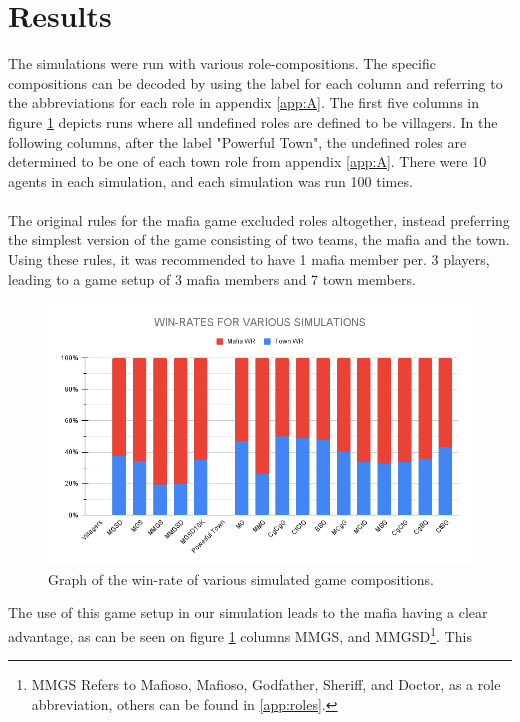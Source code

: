 \section{Results}\label{sec:results}
The simulations were run with various role-compositions. The specific
compositions can be decoded by using the label for each column and referring to
the abbreviations for each role in appendix \ref{app:A}. The first five columns
in figure \ref{fig:VariousSimulations} depicts runs where all undefined roles
are defined to be villagers. In the following columns, after the label
"Powerful Town", the undefined roles are determined to be one of each town role
from appendix \ref{app:A}. There were 10 agents in each simulation, and each
simulation was run 100 times.\\\\ The original rules for the mafia game
excluded roles altogether, instead preferring the simplest version of the game
consisting of two teams, the mafia and the town. Using these
rules\cite{MafiaRules}, it was recommended to have 1 mafia member per. 3
players, leading to a game setup of 3 mafia members and 7 town members.
\begin{figure}[H]
    \includegraphics[width=1\linewidth]{figures/Winrates}
    \caption{Graph of the win-rate of various
        simulated game compositions.}
    \label{fig:VariousSimulations}
\end{figure}
\vspace{-5px}
The use of this game setup in our simulation leads to the mafia having a clear
advantage, as can be seen on figure \ref{fig:VariousSimulations} columns MMGS, and
MMGSD\footnote{MMGS Refers to Mafioso, Mafioso, Godfather, Sheriff, and
    Doctor, as a role abbreviation, others can be found in \ref{app:roles}.}. This
